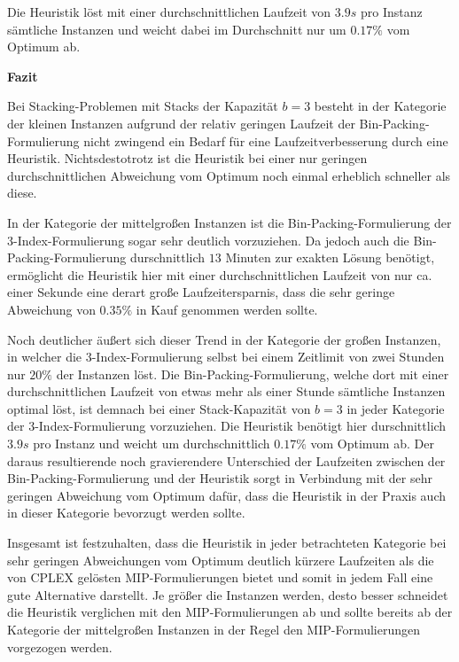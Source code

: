 Die Heuristik löst mit einer durchschnittlichen Laufzeit von $3.9s$ pro Instanz sämtliche Instanzen
und weicht dabei im Durchschnitt nur um $0.17 \%$ vom Optimum ab.

\textbf{Fazit}\newline

Bei Stacking-Problemen mit Stacks der Kapazität $b = 3$ besteht in der Kategorie der kleinen Instanzen
aufgrund der relativ geringen Laufzeit der Bin-Packing-Formulierung nicht zwingend ein Bedarf für eine
Laufzeitverbesserung durch eine Heuristik. Nichtsdestotrotz ist die Heuristik bei einer nur geringen
durchschnittlichen Abweichung vom Optimum noch einmal erheblich schneller als diese.

In der Kategorie der mittelgroßen Instanzen ist die Bin-Packing-Formulierung der 3-Index-Formulierung sogar
sehr deutlich vorzuziehen. Da jedoch auch die Bin-Packing-Formulierung durschnittlich $13$ Minuten zur exakten Lösung benötigt,
ermöglicht die Heuristik hier mit einer durchschnittlichen Laufzeit von nur ca. einer Sekunde eine derart große Laufzeitersparnis,
dass die sehr geringe Abweichung von $0.35 \%$ in Kauf genommen werden sollte.

Noch deutlicher äußert sich dieser Trend in der Kategorie der großen Instanzen, in welcher die 3-Index-Formulierung
selbst bei einem Zeitlimit von zwei Stunden nur $20 \%$ der Instanzen löst. Die Bin-Packing-Formulierung, welche dort
mit einer durchschnittlichen Laufzeit von etwas mehr als einer Stunde sämtliche Instanzen optimal löst,
ist demnach bei einer Stack-Kapazität von $b = 3$ in jeder Kategorie der 3-Index-Formulierung vorzuziehen.
Die Heuristik benötigt hier durschnittlich $3.9s$ pro Instanz und weicht um durchschnittlich $0.17 \%$ vom Optimum ab.
Der daraus resultierende noch gravierendere Unterschied der Laufzeiten zwischen der Bin-Packing-Formulierung und
der Heuristik sorgt in Verbindung mit der sehr geringen Abweichung vom Optimum dafür, dass die Heuristik in der Praxis
auch in dieser Kategorie bevorzugt werden sollte.

Insgesamt ist festzuhalten, dass die Heuristik in jeder betrachteten Kategorie bei sehr geringen Abweichungen
vom Optimum deutlich kürzere Laufzeiten als die von \textsc{CPLEX} gelösten MIP-Formulierungen bietet und somit in
jedem Fall eine gute Alternative darstellt. Je größer die Instanzen werden, desto besser schneidet die Heuristik
verglichen mit den MIP-Formulierungen ab und sollte bereits ab der Kategorie der mittelgroßen Instanzen in der Regel
den MIP-Formulierungen vorgezogen werden.

